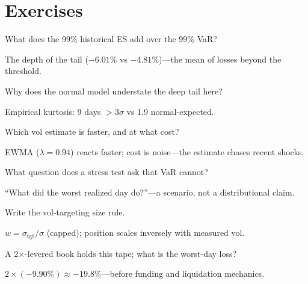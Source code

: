 \section{Exercises}
\begin{exercise}[easy]
What does the 99\% historical ES add over the 99\% VaR?
\end{exercise}
\begin{solution}
The depth of the tail ($-6.01\%$ vs $-4.81\%$)---the mean of losses beyond the threshold.
\end{solution}

\begin{exercise}[easy]
Why does the normal model understate the deep tail here?
\end{exercise}
\begin{solution}
Empirical kurtosis: 9 days $>3\sigma$ vs 1.9 normal-expected.
\end{solution}

\begin{exercise}[easy]
Which vol estimate is faster, and at what cost?
\end{exercise}
\begin{solution}
EWMA ($\lambda{=}0.94$) reacts faster; cost is noise---the estimate chases recent shocks.
\end{solution}

\begin{exercise}[easy]
What question does a stress test ask that VaR cannot?
\end{exercise}
\begin{solution}
``What did the worst realized day do?''---a scenario, not a distributional claim.
\end{solution}

\begin{exercise}[easy]
Write the vol-targeting size rule.
\end{exercise}
\begin{solution}
$w=\sigma_{\text{tgt}}/\hat\sigma$ (capped); position scales inversely with measured vol.
\end{solution}

\begin{exercise}
A 2$\times$-levered book holds this tape; what is the worst-day loss?
\end{exercise}
\begin{solution}
$2\times(-9.90\%)\approx-19.8\%$---before funding and liquidation mechanics.
\end{solution}

